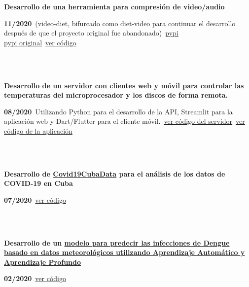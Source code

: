 \documentclass{article}
\begin{document}
    \begin{minipage}{0.8\textwidth}
    \parbox{0.8\linewidth}{\textbf{Desarrollo de una herramienta para compresión de video/audio}} \hfill \textbf{11/2020}\
    (video-diet, bifurcado como diet-video para continuar el desarrollo después de que el proyecto original fue abandonado)\
    \href{https://pypi.org/project/diet-video/}{pypi}\\
    \href{https://pypi.org/project/video-diet/}{pypi original}\
    \href{https://github.com/JavierOramas/video-diet}{ver código}\
    \end{minipage} \hfill {}\\\\
    \begin{minipage}{0.8\textwidth}
    \parbox{0.8\linewidth}{\textbf{Desarrollo de un servidor con clientes web y móvil para controlar las temperaturas del microprocesador y los discos de forma remota.}} \hfill \textbf{08/2020}\
    Utilizando Python para el desarrollo de la API, Streamlit para la aplicación web y Dart/Flutter para el cliente móvil.\
    \href{https://github.com/JavierOramas/temperatureMonitor}{ver código del servidor}\
    \href{https://github.com/JavierOramas/temperatureMonitor-app}{ver código de la aplicación}\
    \end{minipage} \hfill {}\\\\
    \begin{minipage}{0.8\textwidth}
    \parbox{0.8\linewidth}{\textbf{Desarrollo de \hyperref[sec:covid]{Covid19CubaData} para el análisis de los datos de COVID-19 en Cuba}} \hfill \textbf{07/2020}\
    \href{https://github.com/covid19cuba/covid19cuba-action}{ver código}\
    \end{minipage} \hfill {}\\\\
    \begin{minipage}{0.8\textwidth}
    \parbox{0.8\linewidth}{\textbf{Desarrollo de un \hyperref[sec:dengue]{modelo para predecir las infecciones de Dengue basado en datos meteorológicos utilizando Aprendizaje Automático y Aprendizaje Profundo}}} \hfill \textbf{02/2020}\
    \href{https://github.com/JavierOramas/DengAI}{ver código}\
    \end{minipage} \hfill {}\\\\
\end{document}
